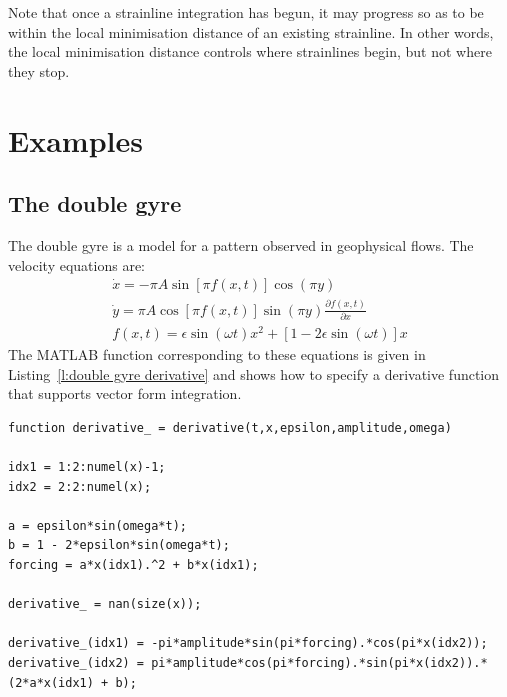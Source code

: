 \documentclass{article}
\begin{document}
Note that once a strainline integration has begun, it may progress so as to be within the local minimisation distance of an existing strainline. In other words, the local minimisation distance controls where strainlines begin, but not where they stop.

\section{Examples}

\subsection{The double gyre}

The double gyre is a model for a pattern observed in geophysical flows\parencite{shadden05:_defin_lagran_lyapun}. The velocity equations are:
\begin{equation}
\begin{split}
\dot x = -\pi A \sin[\pi f(x,t)] \cos(\pi y)\\
\dot y = \pi A \cos[\pi f(x,t)] \sin(\pi y) \frac{\partial f(x,t)}{\partial x}\\
f(x,t) = \epsilon \sin(\omega t) x^2 + [1 - 2 \epsilon \sin(\omega t)] x
\end{split}
\label{e:double gyre derivative equations}
\end{equation}
The MATLAB function corresponding to these equations is given in Listing~\ref{l:double gyre derivative} and shows how to specify a derivative function that supports vector form integration.

\begin{lstlisting}[caption={Double gyre derivative function corresponding to Equations~\ref{e:double gyre derivative equations}.},label=l:double gyre derivative]
function derivative_ = derivative(t,x,epsilon,amplitude,omega)

idx1 = 1:2:numel(x)-1;
idx2 = 2:2:numel(x);

a = epsilon*sin(omega*t);
b = 1 - 2*epsilon*sin(omega*t);
forcing = a*x(idx1).^2 + b*x(idx1);

derivative_ = nan(size(x));

derivative_(idx1) = -pi*amplitude*sin(pi*forcing).*cos(pi*x(idx2));
derivative_(idx2) = pi*amplitude*cos(pi*forcing).*sin(pi*x(idx2)).*(2*a*x(idx1) + b);
\end{lstlisting}
\end{document}

